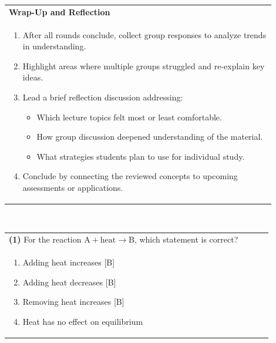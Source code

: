 \documentclass{article}
\begin{document}
\vspace{0.5cm}
\noindent
\begin{tabular}{|p{0.9\linewidth}|}
\hline
{\large\textbf{Wrap-Up and Reflection}} \\
\begin{enumerate}[label=\alph*.]
    \item After all rounds conclude, collect group responses to analyze trends in understanding.
    \item Highlight areas where multiple groups struggled and re-explain key ideas.
    \item Lead a brief reflection discussion addressing:
    \begin{itemize}
        \item Which lecture topics felt most or least comfortable.
        \item How group discussion deepened understanding of the material.
        \item What strategies students plan to use for individual study.
    \end{itemize}
    \item Conclude by connecting the reviewed concepts to upcoming assessments or applications.
\end{enumerate} \\
\hline
\end{tabular}

\newpage
{}\\[0.2em]
\vspace{0.2cm}

\noindent\begin{tabular}{|p{0.9\linewidth}|}
\hline
\textbf{(1)} For the reaction $\text{A} + \text{heat} \rightarrow \text{B}$, which statement is correct? \\[0.2cm]
\begin{minipage}[t]{0.85\linewidth}
\begin{enumerate}[label=\alph*.]
\item Adding heat increases [B]
\item Adding heat decreases [B]
\item Removing heat increases [B]
\item Heat has no effect on equilibrium
\end{enumerate}
\end{minipage}\\[0.2cm]
\hline
\end{tabular}
\end{document}

